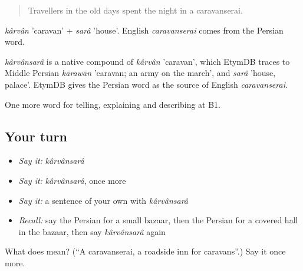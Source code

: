 \begin{quote}
Travellers in the old days spent the night in a caravanserai.
\end{quote}

\emph{kârvân} 'caravan' + \emph{sarâ} 'house'. English \emph{caravanserai} comes from the Persian word.

\begin{cousinweb}
\emph{kârvânsarâ} is a native compound of \emph{kârvân} 'caravan', which EtymDB traces to Middle Persian \emph{kārawān} 'caravan; an army on the march', and \emph{sarâ} 'house, palace'. EtymDB gives the Persian word as the source of English \emph{caravanserai}.
\end{cousinweb}

\begin{grammarlens}[title={What you've built}]
One more word for telling, explaining and describing at B1.
\end{grammarlens}

\subsection*{Your turn}
\begin{itemize}
\raggedright
  \item \emph{Say it:} \emph{kârvânsarâ}
  \item \emph{Say it:} \emph{kârvânsarâ}, once more
  \item \emph{Say it:} a sentence of your own with \emph{kârvânsarâ}
  \item \emph{Recall:} say the Persian for a small bazaar, then the Persian for a covered hall in the bazaar, then say \emph{kârvânsarâ} again
\end{itemize}

\begin{tcolorbox}[breakable,colback=teal!4,colframe=teal!35!black,title={Before you move on}]
What does  mean? (\textquotedblleft{}A caravanserai, a roadside inn for caravans\textquotedblright{}.) Say it once more.
\end{tcolorbox}
